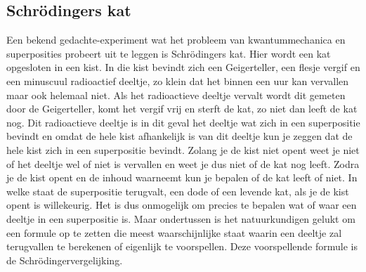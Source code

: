\documentclass[11pt,fleqn]{book} %
\begin{document}
\subsection{Schrödingers kat}
Een bekend gedachte-experiment wat het probleem van kwantummechanica en superposities probeert uit te leggen is Schrödingers kat. Hier wordt een kat opgesloten in een kist. In die kist bevindt zich een Geigerteller, een flesje vergif en een minuscuul radioactief deeltje, zo klein dat het binnen een uur kan vervallen maar ook helemaal niet. Als het radioactieve deeltje vervalt wordt dit gemeten door de Geigerteller, komt het vergif vrij en sterft de kat, zo niet dan leeft de kat nog. Dit radioactieve deeltje is in dit geval het deeltje wat zich in een superpositie bevindt en omdat de hele kist afhankelijk is van dit deeltje kun je zeggen dat de hele kist zich in een superpositie bevindt. Zolang je de kist niet opent weet je niet of het deeltje wel of niet is vervallen en weet je dus niet of de kat nog leeft. Zodra je de kist opent en de inhoud waarneemt kun je bepalen of de kat leeft of niet. In welke staat de superpositie terugvalt, een dode of een levende kat, als je de kist opent is willekeurig.
Het is dus onmogelijk om precies te bepalen wat of waar een deeltje in een superpositie is. Maar ondertussen is het natuurkundigen gelukt om een formule op te zetten die meest waarschijnlijke staat waarin een deeltje zal terugvallen te berekenen of eigenlijk te voorspellen. Deze voorspellende formule is de Schrödingervergelijking.
\end{document}
